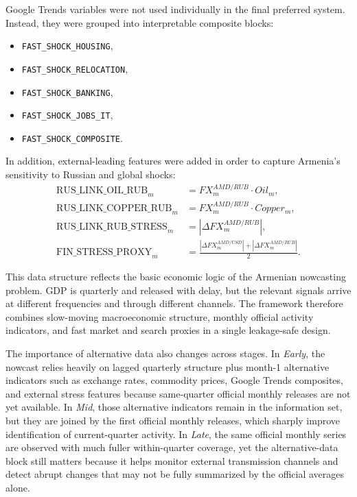 \documentclass[12pt,a4paper]{report}
\begin{document}
Google Trends variables were not used individually in the final preferred system. Instead, they were grouped into interpretable composite blocks:
\begin{itemize}
    \item \texttt{FAST\_SHOCK\_HOUSING},
    \item \texttt{FAST\_SHOCK\_RELOCATION},
    \item \texttt{FAST\_SHOCK\_BANKING},
    \item \texttt{FAST\_SHOCK\_JOBS\_IT},
    \item \texttt{FAST\_SHOCK\_COMPOSITE}.
\end{itemize}

In addition, external-leading features were added in order to capture Armenia's sensitivity to Russian and global shocks:
\begin{align}
    \text{RUS\_LINK\_OIL\_RUB}_m &= FX^{AMD/RUB}_m \cdot Oil_m, \\
    \text{RUS\_LINK\_COPPER\_RUB}_m &= FX^{AMD/RUB}_m \cdot Copper_m, \\
    \text{RUS\_LINK\_RUB\_STRESS}_m &= \left| \Delta FX^{AMD/RUB}_m \right|, \\
    \text{FIN\_STRESS\_PROXY}_m &= \frac{\left| \Delta FX^{AMD/USD}_m \right| + \left| \Delta FX^{AMD/RUB}_m \right|}{2}.
\end{align}

This data structure reflects the basic economic logic of the Armenian nowcasting problem. GDP is quarterly and released with delay, but the relevant signals arrive at different frequencies and through different channels. The framework therefore combines slow-moving macroeconomic structure, monthly official activity indicators, and fast market and search proxies in a single leakage-safe design.

The importance of alternative data also changes across stages. In \textit{Early}, the nowcast relies heavily on lagged quarterly structure plus month-1 alternative indicators such as exchange rates, commodity prices, Google Trends composites, and external stress features because same-quarter official monthly releases are not yet available. In \textit{Mid}, those alternative indicators remain in the information set, but they are joined by the first official monthly releases, which sharply improve identification of current-quarter activity. In \textit{Late}, the same official monthly series are observed with much fuller within-quarter coverage, yet the alternative-data block still matters because it helps monitor external transmission channels and detect abrupt changes that may not be fully summarized by the official averages alone.
\end{document}

